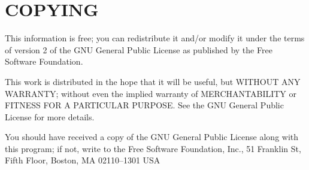 \section{COPYING}


This information is free; you can redistribute it and/or modify
it under the terms of version 2 of the GNU General Public License as
published by the Free Software Foundation.

This work is distributed in the hope that it will be useful,
but WITHOUT ANY WARRANTY; without even the implied warranty of
MERCHANTABILITY or FITNESS FOR A PARTICULAR PURPOSE.  See the
GNU General Public License for more details.

You should have received a copy of the GNU General Public License
along with this program; if not, write to the Free Software
Foundation, Inc., 51 Franklin St, Fifth Floor, Boston, MA  02110--1301  USA
